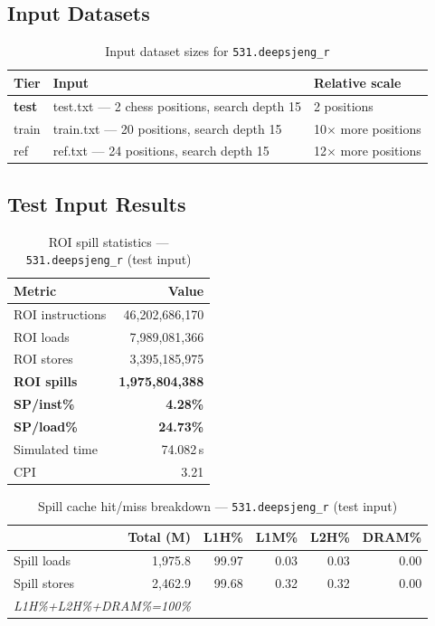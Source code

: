 \documentclass[11pt,a4paper]{article}
\begin{document}
\subsection{Input Datasets}

\begin{table}[H]
\centering
\caption{Input dataset sizes for \texttt{531.deepsjeng\_r}}
\label{tab:deepsjeng_inputs}
\small
\begin{tabular}{lp{8cm}l}
\toprule
\textbf{Tier} & \textbf{Input} & \textbf{Relative scale} \\
\midrule
\textbf{test} & test.txt --- 2 chess positions, search depth 15 & 2 positions \\
train & train.txt --- 20 positions, search depth 15 & 10$\times$ more positions \\
ref & ref.txt --- 24 positions, search depth 15 & 12$\times$ more positions \\
\bottomrule
\end{tabular}
\end{table}

\subsection{Test Input Results}

\begin{table}[H]
\centering
\caption{ROI spill statistics --- \texttt{531.deepsjeng\_r} (test input)}
\label{tab:deepsjeng_test_roi}
\begin{tabular}{lr}
\toprule
\textbf{Metric} & \textbf{Value} \\
\midrule
ROI instructions & 46,202,686,170 \\
ROI loads        & 7,989,081,366 \\
ROI stores       & 3,395,185,975 \\
\textbf{ROI spills}   & \textbf{1,975,804,388} \\
\textbf{SP/inst\%}   & \textbf{4.28\%} \\
\textbf{SP/load\%}   & \textbf{24.73\%} \\
Simulated time   & 74.082\,s \\
CPI              & 3.21 \\
\bottomrule
\end{tabular}
\end{table}

\begin{table}[H]
\centering
\caption{Spill cache hit/miss breakdown --- \texttt{531.deepsjeng\_r} (test input)}
\label{tab:deepsjeng_test_cache}
\begin{tabular}{lrrrrr}
\toprule
\textbf{} & \textbf{Total (M)} & \textbf{L1H\%} & \textbf{L1M\%} & \textbf{L2H\%} & \textbf{DRAM\%} \\
\midrule
Spill loads  & 1,975.8 & 99.97 & 0.03 & 0.03 & 0.00 \\
Spill stores & 2,462.9 & 99.68 & 0.32 & 0.32 & 0.00 \\
\multicolumn{2}{l}{\small\textit{L1H\%+L2H\%+DRAM\%=100\%}} \\
\bottomrule
\end{tabular}
\end{table}
\end{document}
